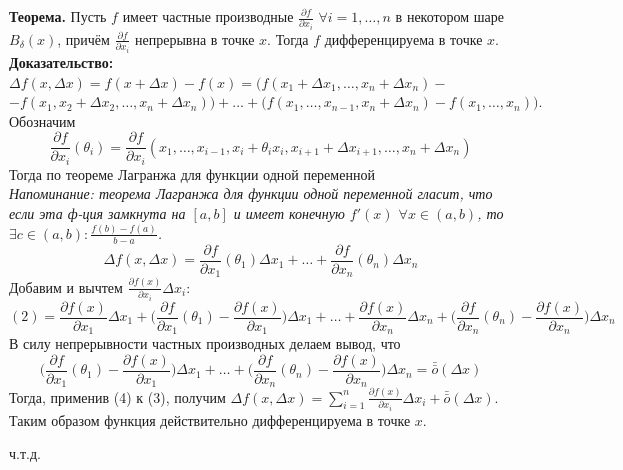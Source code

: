 \documentclass[book, 11pt]{report}
\begin{document}
        \par{\textbf{Теорема. }Пусть $f$ имеет частные производные $\displaystyle\frac{\partial f}{\partial x_i}$ $\forall i=1,\ldots,n$ в некотором шаре $B_{\delta}(x)$, причём $\displaystyle\frac{\partial f}{\partial x_i}$ непрерывна в точке $x$. Тогда $f$ дифференцируема в точке $x$.\\
        \textbf{Доказательство: }$\Delta f(x,\Delta x)=f(x+\Delta x)-f(x)=\bigg(f(x_1+\Delta x_1,\ldots,x_n+\Delta x_n)-$\\$-f(x_1,x_2+\Delta x_2,\ldots,x_n+\Delta x_n)\bigg)+\ldots+\bigg(f(x_1,\ldots,x_{n-1},x_n+\Delta x_n)-f(x_1,\ldots,x_n)\bigg).$\\
        Обозначим
        \begin{equation}
            \frac{\partial f}{\partial x_i}(\theta_i)=\frac{\partial f}{\partial x_i}(x_1,\ldots,x_{i-1},x_i+\theta_i x_i,x_{i+1}+\Delta x_{i+1},\ldots,x_n+\Delta x_n)
        \end{equation}
        Тогда по теореме Лагранжа для функции одной переменной\\
        \textit{Напоминание: теорема Лагранжа для функции одной переменной гласит, что если эта ф-ция замкнута на $[a,b]$ и имеет конечную $f'(x)$ $\forall x\in(a,b)$, то $\exists c\in(a,b): \frac{f(b)-f(a)}{b-a}$.}
        \begin{equation}
            \Delta f(x,\Delta x)=\frac{\partial f}{\partial x_1}(\theta_1)\Delta x_1+\ldots+\frac{\partial f}{\partial x_n}(\theta_n)\Delta x_n
        \end{equation}
        Добавим и вычтем $\displaystyle\frac{\partial f(x)}{\partial x_i}\Delta x_i$:
        \begin{equation}
            (2)=\frac{\partial f(x)}{\partial x_1}\Delta x_1+\bigg(\frac{\partial f}{\partial x_1}(\theta_1)-\frac{\partial f(x)}{\partial x_1}\bigg)\Delta x_1+\ldots+\frac{\partial f(x)}{\partial x_n}\Delta x_n+\bigg(\frac{\partial f}{\partial x_n}(\theta_n)-\frac{\partial f(x)}{\partial x_n}\bigg)\Delta x_n
        \end{equation}
        В силу непрерывности частных производных делаем вывод, что
        \begin{equation}
            \bigg(\frac{\partial f}{\partial x_1}(\theta_1)-\frac{\partial f(x)}{\partial x_1}\bigg)\Delta x_1+\ldots+ \bigg(\frac{\partial f}{\partial x_n}(\theta_n)-\frac{\partial f(x)}{\partial x_n}\bigg)\Delta x_n=\bar{\bar{o}}(\Delta x)
        \end{equation}
        Тогда, применив (4) к (3), получим $\displaystyle\Delta f(x,\Delta x)=\sum_{i=1}^n\frac{\partial f(x)}{\partial x_i}\Delta x_i+\bar{\bar{o}}(\Delta x)$. Таким образом функция действительно дифференцируема в точке $x$.
        }
        \par{{\raggedleft ч.т.д.\par}}
        \newpage
        \setcounter{equation}{0}
\end{document}
